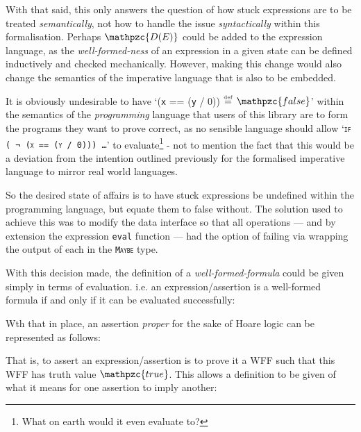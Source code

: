 \documentclass[oneside,12pt]{article}
\newcommand{\impcode}[1]{\textsc{\texttt{#1}}}
\newcommand{\textM}[1]{\ensuremath{\mathpzc{#1}}}
\newcommand{\eqdef}{$\stackrel{\text{\tiny def}}{=}$}
\begin{document}
With that said, this only answers the question of how stuck expressions are to be treated \emph{semantically}, not how to handle the issue \emph{syntactically} within this formalisation. Perhaps \textM{D(E)} could be added to the expression language, as the \emph{well-formed-ness} of an expression in a given state can be defined inductively and checked mechanically. However, making this change would also change the semantics of the imperative language that is also to be embedded.


It is obviously undesirable to have `(\texttt{x} == (\texttt{y} / 0)) \eqdef \; \textM{false}' within the semantics of the \emph{programming} language that users of this library are to form the programs they want to prove correct, as no sensible language should allow \mbox{`\impcode{if ( ¬ (\texttt{x} == (\texttt{y} / 0))) \ldots}'} to evaluate\footnote{What on earth would it even evaluate to?}  - not to mention the fact that this would be a deviation from the intention outlined previously for the formalised imperative language to mirror real world languages.


So the desired state of affairs is to have stuck expressions be undefined within the programming language, but equate them to false without.  The solution used to achieve this was to modify the data interface so that all operations --- and by extension the expression \texttt{eval} function --- had the option of failing via wrapping the output of each in the \impcode{Maybe} type. 


With this decision made, the definition of a \emph{well-formed-formula} could be given simply in terms of evaluation. i.e.\!\! an expression/assertion is a well-formed formula if and only if it can be evaluated successfully:

{\advance\leftskip\mathindent
  \advance\leftskip\mathindent
  


}

Wth that in place, an assertion \emph{proper} for the sake of Hoare logic can be represented as follows:


{\advance\leftskip\mathindent
  \advance\leftskip\mathindent



}

\vspace{-1.5em}

That is, to assert an expression/assertion is to prove it a WFF such that this WFF has truth value \textM{true}. This allows a definition to be given of what it means for one assertion to imply another:
\end{document}
